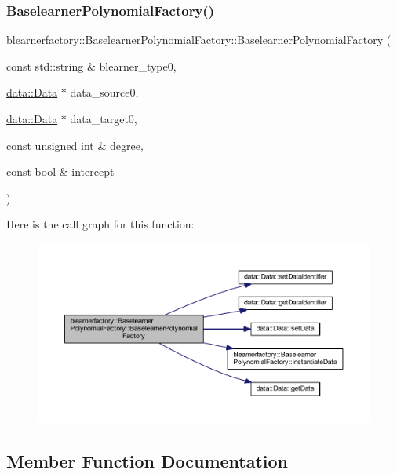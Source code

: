 \subsubsection{\texorpdfstring{Baselearner\+Polynomial\+Factory()}{BaselearnerPolynomialFactory()}}
{\footnotesize\ttfamily blearnerfactory\+::\+Baselearner\+Polynomial\+Factory\+::\+Baselearner\+Polynomial\+Factory (\begin{DoxyParamCaption}\item[{const std\+::string \&}]{blearner\+\_\+type0,  }\item[{\mbox{\hyperlink{classdata_1_1_data}{data\+::\+Data}} $\ast$}]{data\+\_\+source0,  }\item[{\mbox{\hyperlink{classdata_1_1_data}{data\+::\+Data}} $\ast$}]{data\+\_\+target0,  }\item[{const unsigned int \&}]{degree,  }\item[{const bool \&}]{intercept }\end{DoxyParamCaption})}

Here is the call graph for this function\+:
\nopagebreak
\begin{figure}[H]
\begin{center}
\leavevmode
\includegraphics[width=350pt]{classblearnerfactory_1_1_baselearner_polynomial_factory_aaa0dbb3dab4a98dfb1835998fc3ffa50_cgraph}
\end{center}
\end{figure}


\subsection{Member Function Documentation}
\mbox{\label{classblearnerfactory_1_1_baselearner_polynomial_factory_a18095806fa93e6ac2159e966ededc1cf}} 
